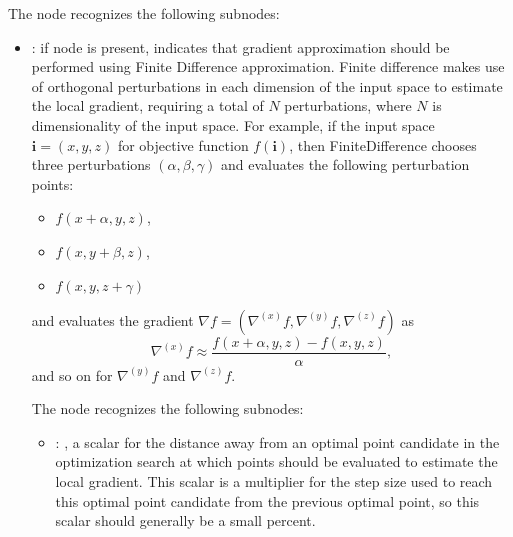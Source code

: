 \begin{itemize}
      The  node recognizes the following subnodes:
      \begin{itemize}
        \item {}:
          if node is present, indicates that gradient approximation should be performed
          using Finite Difference approximation. Finite difference makes use of orthogonal
          perturbations         in each dimension of the input space to estimate the local gradient,
          requiring a total of $N$         perturbations, where $N$ is dimensionality of the input
          space. For example, if the input space         $\mathbf{i} = (x, y, z)$ for objective
          function $f(\mathbf{i})$, then FiniteDifference chooses         three perturbations
          $(\alpha, \beta, \gamma)$ and evaluates the following perturbation points:
          \begin{itemize}           \item $f(x+\alpha, y, z)$,           \item $f(x, y+\beta, z)$,
          \item $f(x, y, z+\gamma)$         \end{itemize}         and evaluates the gradient $\nabla
          f = (\nabla^{(x)} f, \nabla^{(y)} f, \nabla^{(z)} f)$ as         \begin{equation*}
          \nabla^{(x)}f \approx \frac{f(x+\alpha, y, z) - f(x, y, z)}{\alpha},
          \end{equation*}         and so on for $ \nabla^{(y)}f$ and $\nabla^{(z)}f$.

          The  node recognizes the following subnodes:
          \begin{itemize}
            \item {}: , 
              a scalar for the distance away from an optimal point candidate in the optimization
              search at which points should be evaluated to estimate the local gradient. This scalar
              is a         multiplier for the step size used to reach this optimal point candidate
              from the previous         optimal point, so this scalar should generally be a small
              percent. 
          \end{itemize}


\end{itemize}
\end{itemize}
